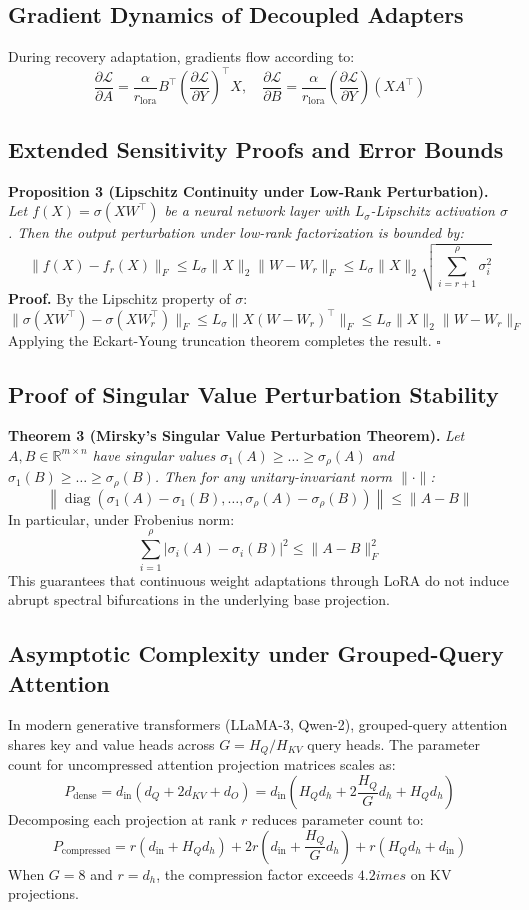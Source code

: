 \documentclass{article}
\begin{document}
\subsection*{Gradient Dynamics of Decoupled Adapters}
During recovery adaptation, gradients flow according to:
\[
\frac{\partial \mathcal{L}}{\partial A} = \frac{\alpha}{r_{\text{lora}}} B^\top \left( \frac{\partial \mathcal{L}}{\partial Y} \right)^\top X, \quad \frac{\partial \mathcal{L}}{\partial B} = \frac{\alpha}{r_{\text{lora}}} \left( \frac{\partial \mathcal{L}}{\partial Y} \right) (X A^\top)
\]

\subsection*{Extended Sensitivity Proofs and Error Bounds}
\textbf{Proposition 3 (Lipschitz Continuity under Low-Rank Perturbation).} \textit{Let $f(X) = \sigma(X W^\top)$ be a neural network layer with $L_\sigma$-Lipschitz activation $\sigma$. Then the output perturbation under low-rank factorization is bounded by:}
\[
\|f(X) - f_r(X)\|_F \le L_\sigma \|X\|_2 \|W - W_r\|_F \le L_\sigma \|X\|_2 \sqrt{\sum_{i=r+1}^\rho \sigma_i^2}
\]
\textbf{Proof.} By the Lipschitz property of $\sigma$:
\[
\|\sigma(X W^\top) - \sigma(X W_r^\top)\|_F \le L_\sigma \|X (W - W_r)^\top\|_F \le L_\sigma \|X\|_2 \|W - W_r\|_F
\]
Applying the Eckart-Young truncation theorem completes the result. $\square$

\subsection*{Proof of Singular Value Perturbation Stability}
\textbf{Theorem 3 (Mirsky's Singular Value Perturbation Theorem).} \textit{Let $A, B \in \mathbb{R}^{m \times n}$ have singular values $\sigma_1(A) \ge \dots \ge \sigma_\rho(A)$ and $\sigma_1(B) \ge \dots \ge \sigma_\rho(B)$. Then for any unitary-invariant norm $\|\cdot\|$:}
\[
\left\| \operatorname{diag}(\sigma_1(A) - \sigma_1(B), \dots, \sigma_\rho(A) - \sigma_\rho(B)) \right\| \le \|A - B\|
\]
In particular, under Frobenius norm:
\[
\sum_{i=1}^\rho |\sigma_i(A) - \sigma_i(B)|^2 \le \|A - B\|_F^2
\]
This guarantees that continuous weight adaptations through LoRA do not induce abrupt spectral bifurcations in the underlying base projection.

\subsection*{Asymptotic Complexity under Grouped-Query Attention}
In modern generative transformers (LLaMA-3, Qwen-2), grouped-query attention shares key and value heads across $G = H_Q / H_{KV}$ query heads. The parameter count for uncompressed attention projection matrices scales as:
\[
P_{\text{dense}} = d_{\text{in}} \left( d_Q + 2 d_{KV} + d_O \right) = d_{\text{in}} \left( H_Q d_h + 2 \frac{H_Q}{G} d_h + H_Q d_h \right)
\]
Decomposing each projection at rank $r$ reduces parameter count to:
\[
P_{\text{compressed}} = r \left( d_{\text{in}} + H_Q d_h \right) + 2 r \left( d_{\text{in}} + \frac{H_Q}{G} d_h \right) + r \left( H_Q d_h + d_{\text{in}} \right)
\]
When $G = 8$ and $r = d_h$, the compression factor exceeds $4.2	imes$ on KV projections.
\end{document}
